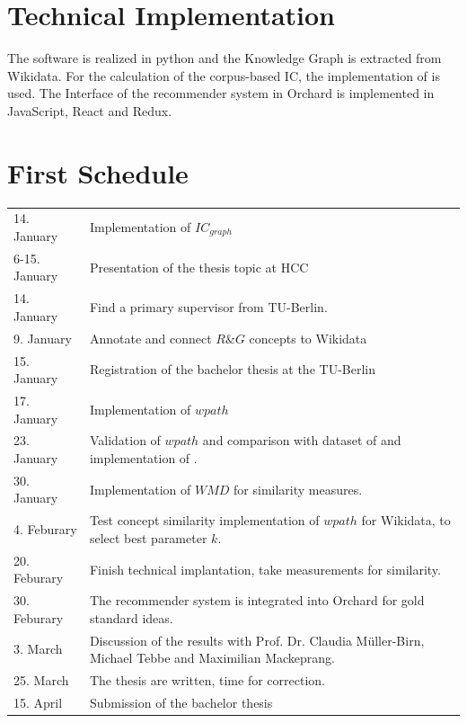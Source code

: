 \documentclass[pdftex,a4paper,12pt]{scrartcl}
\theoremstyle{definition}
\begin{document}
    
    
   
    
    
    
    
    

\section{Technical Implementation}
    
    The software is realized in python and  the Knowledge Graph is extracted from Wikidata.
    For the calculation of the corpus-based IC, the implementation of \citet{zhu_computing_2017} is used. 
    The Interface of the recommender system in Orchard is implemented in JavaScript, React and Redux.  
    

\section{First Schedule}
\renewcommand{\arraystretch}{1.5}
\begin{tabularx}{\textwidth}{lX}
14. January & Implementation of $IC_{graph}$\\
6-15. January & Presentation of the thesis topic at HCC\\
14. January & Find a primary supervisor from TU-Berlin.\\
9. January & Annotate and connect $R\&G$ concepts to Wikidata\\
15. January & Registration of the bachelor thesis at the TU-Berlin \\
17. January & Implementation of $wpath$\\
23. January & Validation of $wpath$ and comparison with dataset of \citet{rubenstein_contextual_1965} and implementation of \citet{zhu_computing_2017}.\\
30. January & Implementation of $WMD$ for similarity measures. \\
4. Feburary & Test concept similarity implementation of $wpath$ for Wikidata, to select best parameter $k$. \\
20. Feburary & Finish technical implantation, take measurements for similarity.\\
30. Feburary & The recommender system is integrated into Orchard for gold standard ideas. \\
3. March & Discussion of the results with Prof. Dr. Claudia Müller-Birn, Michael Tebbe and Maximilian Mackeprang.\\
25. March & The thesis are written, time for correction.\\
15. April & Submission of the bachelor thesis\\
\end{tabularx}
\end{document}

